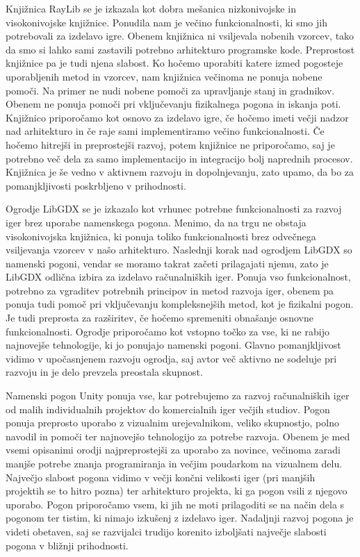 \documentclass[12pt,a4paper,twoside]{book}
\begin{document}
Knjižnica RayLib se je izkazala kot dobra mešanica nizkonivojske in visokonivojske knjižnice. Ponudila nam je večino funkcionalnosti, ki smo jih potrebovali za izdelavo igre. Obenem knjižnica ni vsiljevala nobenih vzorcev, tako da smo si lahko sami zastavili potrebno arhitekturo programske kode. Preprostost knjižnice pa je tudi njena slabost. Ko hočemo uporabiti katere izmed pogosteje uporabljenih metod in vzorcev, nam knjižnica večinoma ne ponuja nobene pomoči. Na primer ne nudi nobene pomoči za upravljanje stanj in gradnikov. Obenem ne ponuja pomoči pri vključevanju fizikalnega pogona in iskanja poti. Knjižnico priporočamo kot osnovo za izdelavo igre, če hočemo imeti večji nadzor nad arhitekturo in če raje sami implementiramo večino funkcionalnosti. Če hočemo hitrejši in preprostejši razvoj, potem knjižnice ne priporočamo, saj je potrebno več dela za samo implementacijo in integracijo bolj naprednih procesov. Knjižnica je še vedno v aktivnem razvoju in dopolnjevanju, zato upamo, da bo za pomanjkljivosti poskrbljeno v prihodnosti. 

Ogrodje LibGDX se je izkazalo kot vrhunec potrebne funkcionalnosti za razvoj iger brez uporabe namenskega pogona. Menimo, da na trgu ne obstaja visokonivojska knjižnica, ki ponuja toliko funkcionalnosti brez odvečnega vsiljevanja vzorcev v našo arhitekturo. Naslednji korak nad ogrodjem LibGDX so namenski pogoni, vendar se moramo takrat začeti prilagajati njemu, zato je LibGDX odlična izbira za izdelavo računalniških iger. Ponuja vso funkcionalnost, potrebno za vgraditev potrebnih principov in metod razvoja iger, obenem pa ponuja tudi pomoč pri vključevanju kompleksnejših metod, kot je fizikalni pogon. Je tudi preprosta za razširitev, če hočemo spremeniti obnašanje osnovne funkcionalnosti. Ogrodje priporočamo kot vstopno točko za vse, ki ne rabijo najnovejše tehnologije, ki jo ponujajo namenski pogoni. Glavno pomanjkljivost vidimo v upočasnjenem razvoju ogrodja, saj avtor več aktivno ne sodeluje pri razvoju in je delo prevzela preostala skupnost.

Namenski pogon Unity ponuja vse, kar potrebujemo za razvoj računalniških iger od malih individualnih projektov do komercialnih iger večjih studiov. Pogon ponuja preprosto uporabo z vizualnim urejevalnikom, veliko skupnostjo, polno navodil in pomoči ter najnovejšo tehnologijo za potrebe razvoja. Obenem je med vsemi opisanimi orodji najpreprostejši za uporabo za novince, večinoma zaradi manjše potrebe znanja programiranja in večjim poudarkom na vizualnem delu. Največjo slabost pogona vidimo v večji končni velikosti iger (pri manjših projektih se to hitro pozna) ter arhitekturo projekta, ki ga pogon vsili z njegovo uporabo. Pogon priporočamo vsem, ki jih ne moti prilagoditi se na način dela s pogonom ter tistim, ki nimajo izkušenj z izdelavo iger. Nadaljnji razvoj pogona je videti obetaven, saj se razvijalci trudijo korenito izboljšati največje slabosti pogona v bližnji prihodnosti.
\end{document}
